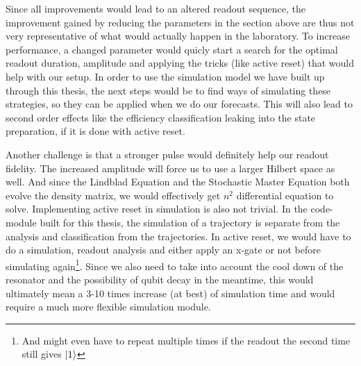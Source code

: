 Since all improvements would lead to an altered readout sequence, the improvement gained by reducing the parameters in the section above are thus not very representative of what would actually happen in the laboratory. To increase performance, a changed parameter would quicly start a search for the optimal readout duration, amplitude and applying the tricks (like active reset) that would help with our setup. In order to use the simulation model we have built up through this thesis, the next steps would be to find ways of simulating these strategies, so they can be applied when we do our forecasts. This will also lead to second order effects like the efficiency classification leaking into the state preparation, if it is done with active reset.

Another challenge is that a stronger pulse would definitely help our readout fidelity. The increased amplitude will force us to use a larger Hilbert space as well. And since the Lindblad Equation and the Stochastic Master Equation both evolve the density matrix, we would effectively get $n^2$ differential equation to solve. Implementing active reset in simulation is also not trivial. In the code-module built for this thesis, the simulation of a trajectory is separate from the analysis and classification from the trajectories. In active reset, we would have to do a simulation, readout analysis and either apply an x-gate or not before simulating again\footnote{And might even have to repeat multiple times if the readout the second time still gives $\ket{1}$}. Since we also need to take into account the cool down of the resonator and the possibility of qubit decay in the meantime, this would ultimately mean a 3-10 times increase  (at best)  of simulation time and would require a much more flexible simulation module.